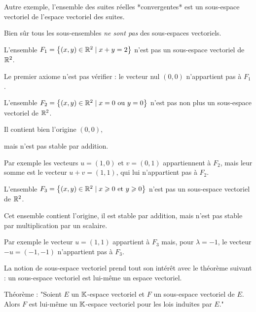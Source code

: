 \change

Autre exemple, l'ensemble des suites réelles *convergentes* est un sous-espace vectoriel 
de l'espace vectoriel des suites.



\diapo

Bien sûr tous les sous-ensembles \emph{ne sont pas} des sous-espaces vectoriels.

\change

L'ensemble $F_1=\big\{(x,y)\in \mathbb{R}^2\mid x+y=2\big\}$ n'est pas un sous-espace vectoriel de $\mathbb{R}^2$.


\change

Le premier axiome n'est pas vérifier : le vecteur nul $(0,0)$ n'appartient pas à $F_1$.

  \change
  
L'ensemble $F_2=\big\{(x,y)\in \mathbb{R}^2\mid x=0 \text{ ou } y=0 \big\}$ n'est pas non plus 
un sous-espace vectoriel de $\mathbb{R}^2$.

Il contient bien l'origine $(0,0)$,

\change
 
mais n'est pas stable par addition.

Par exemple les vecteurs $u=(1,0)$ et $v=(0,1)$ appartiennent à $F_2$, mais leur somme est 
le vecteur $u+v=(1,1)$, qui lui n'appartient pas à $F_2$.
  
  \change
  
L'ensemble $F_3=\big\{(x,y)\in \mathbb{R}^2\mid x \geqslant 0 \text{ et } y\geqslant 0\big\}$ n'est pas un sous-espace vectoriel de $\mathbb{R}^2$.

Cet ensemble contient l'origine, il est stable par addition, mais n'est pas stable 
par multiplication par un scalaire.

\change

 Par exemple le vecteur $u=(1,1)$ appartient à $F_3$ mais, pour $\lambda = -1$, 
 le vecteur $-u = (-1,-1)$ n'appartient pas à $F_3$.



\diapo

La notion de sous-espace vectoriel prend tout son intérêt avec le théorème suivant :
un sous-espace vectoriel est lui-même un espace vectoriel.


Théorème : "Soient $E$ un $\mathbb{K}$-espace vectoriel et $F$ un sous-espace vectoriel de $E$. 
Alors $F$ est lui-même un $\mathbb{K}$-espace vectoriel pour les lois induites par $E$." 


